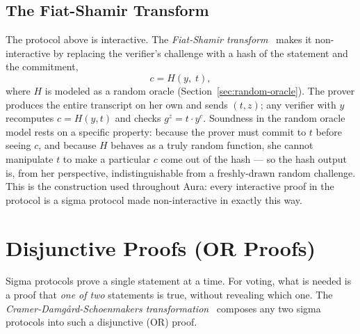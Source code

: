 \documentclass[12pt,a4paper,oneside]{report}
\begin{document}
\subsection*{The Fiat-Shamir Transform}
The protocol above is interactive. The \textit{Fiat-Shamir transform}~\cite{fiatshamir} 
makes it non-interactive by replacing the verifier's challenge with a 
hash of the statement and the commitment,
\[
    c = H(y,\; t),
\]
where $H$ is modeled as a random oracle (Section~\ref{sec:random-oracle}). 
The prover produces the entire transcript on her own and sends $(t, z)$; 
any verifier with $y$ recomputes $c = H(y, t)$ and checks 
$g^z = t \cdot y^c$. Soundness in the random oracle model rests on a 
specific property: because the prover must commit to $t$ before seeing 
$c$, and because $H$ behaves as a truly random function, she cannot 
manipulate $t$ to make a particular $c$ come out of the hash --- so the 
hash output is, from her perspective, indistinguishable from a 
freshly-drawn random challenge. This is the construction used throughout 
Aura: every interactive proof in the protocol is a sigma protocol made 
non-interactive in exactly this way.
\section{Disjunctive Proofs (OR Proofs)}
\label{sec:or-proofs}

Sigma protocols prove a single statement at a time. For voting, what is 
needed is a proof that \textit{one of two} statements is true, without 
revealing which one. The \textit{Cramer-Damg\aa rd-Schoenmakers 
transformation}~\cite{cramer-damgard} composes any two sigma protocols 
into such a disjunctive (OR) proof.
\end{document}
